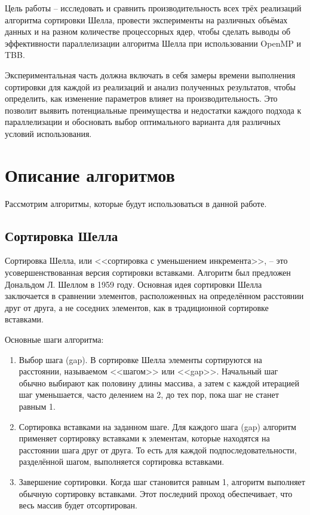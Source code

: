 \documentclass[]{article}
\theoremstyle{remark}
\theoremstyle{definition}
\begin{document}
\par Цель работы -- исследовать и сравнить производительность всех трёх реализаций алгоритма сортировки Шелла, провести эксперименты на различных объёмах данных и на разном количестве процессорных ядер, чтобы сделать выводы об эффективности параллелизации алгоритма Шелла при использовании OpenMP и TBB.

\par Экспериментальная часть должна включать в себя замеры времени выполнения сортировки для каждой из реализаций и анализ полученных результатов, чтобы определить, как изменение параметров влияет на производительность. Это позволит выявить потенциальные преимущества и недостатки каждого подхода к параллелизации и обосновать выбор оптимального варианта для различных условий использования.

\newpage

\section{Описание алгоритмов}

\par Рассмотрим алгоритмы, которые будут использоваться в данной работе.

\subsection{Сортировка Шелла}

\par Сортировка Шелла, или <<сортировка с уменьшением инкремента>>, -- это усовершенствованная версия сортировки вставками. Алгоритм был предложен Дональдом Л. Шеллом в 1959 году. Основная идея сортировки Шелла заключается в сравнении элементов, расположенных на определённом расстоянии друг от друга, а не соседних элементов, как в традиционной сортировке вставками.

\par Основные шаги алгоритма:

\begin{enumerate}
    \item Выбор шага (gap). В сортировке Шелла элементы сортируются на расстоянии, называемом <<шагом>> или <<gap>>. Начальный шаг обычно выбирают как половину длины массива, а затем с каждой итерацией шаг уменьшается, часто делением на 2, до тех пор, пока шаг не станет равным 1.
    \item Сортировка вставками на заданном шаге. Для каждого шага (gap) алгоритм применяет сортировку вставками к элементам, которые находятся на расстоянии шага друг от друга. То есть для каждой подпоследовательности, разделённой шагом, выполняется сортировка вставками.
    \item Завершение сортировки. Когда шаг становится равным 1, алгоритм выполняет обычную сортировку вставками. Этот последний проход обеспечивает, что весь массив будет отсортирован.
\end{enumerate}
\end{document}
